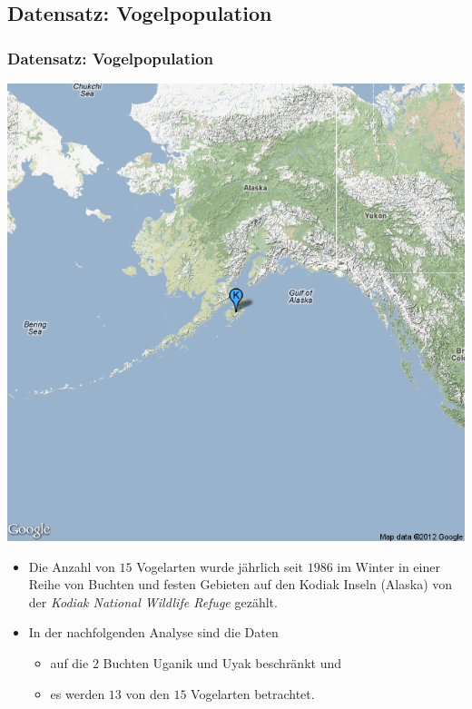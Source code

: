 \documentclass[xcolor=dvipsnames, compress, serif, professionalfont, handout]{beamer}
\begin{document}
\subsection{Datensatz: Vogelpopulation}
\begin{frame}[fragile]
\frametitle{Datensatz: Vogelpopulation}


  \begin{minipage}{0.48\textwidth}
    \includegraphics[width = 1.\linewidth, height = 1.\linewidth]{kodiak_insel.png}
  \end{minipage} 
  \hspace{0.1cm}
  \begin{minipage}{0.48\textwidth}
    \begin{itemize}
      \item<1-> Die Anzahl von $15$ Vogelarten wurde j\"ahrlich seit $1986$ im 
                Winter in einer Reihe von Buchten und festen Gebieten auf den 
                Kodiak Inseln (Alaska) von der \textit{Kodiak National Wildlife 
                Refuge} gez\"ahlt.
      \item<2-> In der nachfolgenden Analyse sind die Daten
                \begin{itemize}
                  \item auf die $2$ Buchten Uganik und Uyak beschr\"ankt und
                  \item es werden $13$ von den $15$ Vogelarten betrachtet.
                \end{itemize}
    \end{itemize}
  \end{minipage}
\end{frame} 
\end{document}
